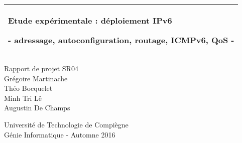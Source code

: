 %
%
%
%
%
\begin{titlepage}
  \addtolength{\hoffset}{0.5\evensidemargin-0.5\oddsidemargin} %
  \noindent%
  \begin{tabular}{@{}p{\textwidth}@{}}
    \toprule[2pt]
    \midrule
    \vspace{0.2cm}
    \begin{center}
    \Huge{\textbf{
      Etude expérimentale : déploiement IPv6%
    }}
    \end{center}
    \begin{center}
      \Large{
        - adressage, autoconfiguration, routage, ICMPv6, QoS -%
      }
    \end{center}
    \vspace{0.2cm}\\
    \midrule
    \toprule[2pt]
  \end{tabular}
  \vspace{4 cm}
  \begin{center}
    {\large
      Rapport de projet SR04%
    }\\
    \vspace{0.2cm}
    {\Large
      Grégoire Martinache\\
      Théo Bocquelet\\
      Minh Tri L\^{e}\\
      Augustin De Champs
    }
  \end{center}
  \vfill
  \begin{center}
  Université de Technologie de Compiègne\\
  Génie Informatique - Automne 2016
  \end{center}
\end{titlepage}
\clearpage